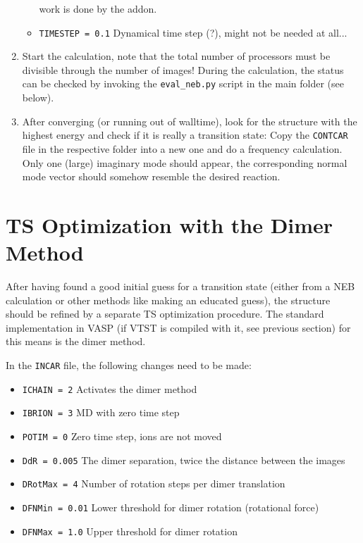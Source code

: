 \documentclass[a4paper,11pt]{article}
\begin{document}
\begin{enumerate}
\begin{itemize}
  work is done by the addon.
  \item \texttt{TIMESTEP = 0.1} Dynamical time step (?), might not be needed at all...
 \end{itemize}
\item Start the calculation, note that the total number of processors must be divisible through the 
number of images! During the calculation, the status can be checked by invoking the \texttt{eval\_neb.py}
script in the main folder (see below).
\item After converging (or running out of walltime), look for the structure with the highest energy and 
check if it is really a transition state: Copy the \texttt{CONTCAR} file in the respective folder 
into a new one and do a frequency calculation. Only one (large) imaginary mode should appear, the 
corresponding normal mode vector should somehow resemble the desired reaction.
\end{enumerate}

\section{TS Optimization with the Dimer Method}

After having found a good initial guess for a transition state (either from a NEB calculation
or other methods like making an educated guess), the structure should be refined by a separate
TS optimization procedure. The standard implementation in VASP (if VTST is compiled with it, see
previous section) for this means is the dimer method.

In the \texttt{INCAR} file, the following changes need to be made:

\begin{itemize}
 \item \texttt{ICHAIN = 2} Activates the dimer method
 \item \texttt{IBRION = 3} MD with zero time step
 \item \texttt{POTIM = 0} Zero time step, ions are not moved 
 \item \texttt{DdR = 0.005} The dimer separation, twice the distance between the images 
 \item \texttt{DRotMax = 4} Number of rotation steps per dimer translation
 \item \texttt{DFNMin = 0.01} Lower threshold for dimer rotation (rotational force)
 \item \texttt{DFNMax = 1.0} Upper threshold for dimer rotation
 \end{itemize}
\end{document}

